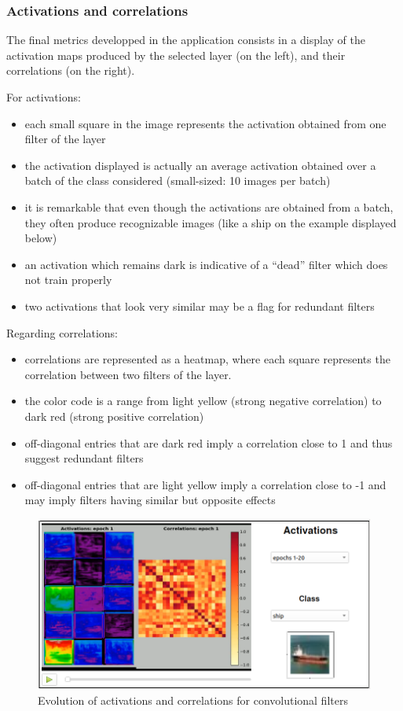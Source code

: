 \subsubsection{Activations and correlations}

The final metrics developped in the application consists in a display of the activation maps produced by the selected layer (on the left), and their correlations (on the right).

For activations:

\begin{itemize}
	\item each small square in the image represents the activation obtained from one filter of the layer
	\item the activation displayed is actually an average activation obtained over a batch of the class considered (small-sized: 10 images per batch)
	\item it is remarkable that even though the activations are obtained from a batch, they often produce recognizable images (like a ship on the example displayed below)
	\item an activation which remains dark is indicative of a ``dead'' filter which does not train properly
	\item two activations that look very similar may be a flag for redundant filters
\end{itemize}

Regarding correlations:

\begin{itemize}
	\item correlations are represented as a heatmap, where each square represents the correlation between two filters of the layer.
	\item the color code is a range from light yellow (strong negative correlation) to dark red (strong positive correlation)
	\item off-diagonal entries that are dark red imply a correlation close to 1 and thus suggest redundant filters
	\item off-diagonal entries that are light yellow imply a correlation close to -1 and may imply filters having similar but opposite effects
\end{itemize}


\begin{figure}[H]
	\centering
	\includegraphics[scale=0.6]{images/weights-grads-viewer/Quadrant_activation.png}
	\caption{Evolution of activations and correlations for convolutional filters}
\end{figure}


